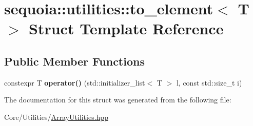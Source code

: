 \hypertarget{structsequoia_1_1utilities_1_1to__element}{}\section{sequoia\+::utilities\+::to\+\_\+element$<$ T $>$ Struct Template Reference}
\label{structsequoia_1_1utilities_1_1to__element}
\subsection*{Public Member Functions}
\begin{DoxyCompactItemize}
\item 
\mbox{\label{structsequoia_1_1utilities_1_1to__element_aecfa83a45260179dde3731c3937e0519}} 
constexpr T {\bfseries operator()} (std\+::initializer\+\_\+list$<$ T $>$ l, const std\+::size\+\_\+t i)
\end{DoxyCompactItemize}


The documentation for this struct was generated from the following file\+:\begin{DoxyCompactItemize}
\item 
Core/\+Utilities/\mbox{\hyperlink{_array_utilities_8hpp}{Array\+Utilities.\+hpp}}\end{DoxyCompactItemize}
